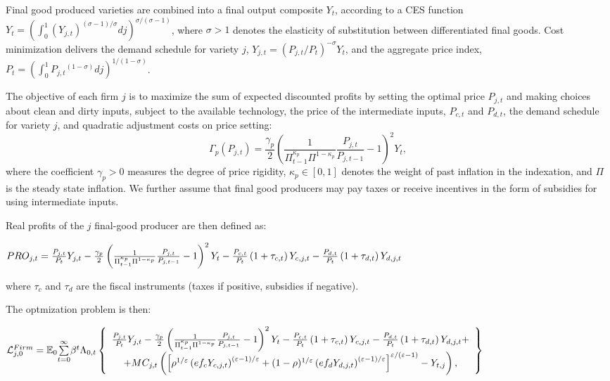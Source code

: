 \documentclass{article}
\begin{document}
Final good produced varieties are combined into a final output composite $%
Y_{t}$, according to a CES function $Y_{t}=\left( \int_{0}^{1}\left(
Y_{j,t}\right) ^{\left( \sigma -1\right) /\sigma }dj\right) ^{\sigma
/(\sigma -1)}$, where $\sigma >1$ denotes the elasticity of substitution
between differentiated final goods. Cost minimization delivers the demand
schedule for variety $j$, $Y_{j,t}=\left( P_{j,t}/P_{t}\right) ^{-\sigma
}Y_{t}$, and the aggregate price index, $P_{t}=\left(
\int_{0}^{1}P_{j,t}{}^{(1-\sigma )}dj\right) ^{1/(1-\sigma )}$.

The objective of each firm $j$ is to maximize the sum of expected discounted
profits by setting the optimal price $P_{j,t}$ and making choices about
clean and dirty inputs, subject to the available technology, the price of
the intermediate inputs, $P_{c,t}$ and $P_{d,t}$, the demand schedule for
variety $j$, and quadratic adjustment costs on price setting:%
\begin{equation}
\Gamma _{p}(P_{j,t})=\frac{\gamma _{p}}{2}\left( \frac{1}{\Pi _{t-1}^{\kappa
_{p}}\Pi ^{1-\kappa _{p}}}\frac{P_{j,t}}{P_{j,t-1}}-1\right) ^{2}Y_{t},
\label{price_adjust}
\end{equation}%
where the coefficient $\gamma _{p}>0$ measures the degree of price rigidity, 
$\kappa _{p}\in \left[ 0,1\right] $ denotes the weight of past inflation in
the indexation, and $\Pi $ is the steady state inflation. We further assume
that final good producers may pay taxes or receive incentives in the form of
subsidies for using intermediate inputs.

Real profits of the $j$ final-good producer are then defined as:

$PRO_{j,t}=\frac{P_{j,t}}{P_{t}}Y_{j,t}-\frac{\gamma _{p}}{2}\left( \frac{1}{%
\Pi _{t-1}^{\kappa _{p}}\Pi ^{1-\kappa _{p}}}\frac{P_{j,t}}{P_{j,t-1}}%
-1\right) ^{2}Y_{t}-\frac{P_{c,t}}{P_{t}}\left( 1+\tau _{c,t}\right)
Y_{c,j,t}-\frac{P_{d,t}}{P_{t}}\left( 1+\tau _{d,t}\right) Y_{d,j,t}$

where $\tau _{c}$ and $\tau _{d}$ are the fiscal instruments (taxes if
positive, subsidies if negative).

The optmization problem is then:

$\mathcal{L}_{j,0}^{Firm}=\mathbb{E}_{0}\underset{t=0}{\overset{\infty }{%
\sum }}\beta ^{t}\Lambda _{0,t}\left\{ 
\begin{array}{c}
\frac{P_{j,t}}{P_{t}}Y_{j,t}-\frac{\gamma _{p}}{2}\left( \frac{1}{\Pi
_{t-1}^{\kappa _{p}}\Pi ^{1-\kappa _{p}}}\frac{P_{j,t}}{P_{j,t-1}}-1\right)
^{2}Y_{t}-\frac{P_{c,t}}{P_{t}}\left( 1+\tau _{c,t}\right) Y_{c,j,t}-\frac{%
P_{d,t}}{P_{t}}\left( 1+\tau _{d,t}\right) Y_{d,j,t}+ \\ 
+MC_{j,t}\left( \left[ \rho ^{1/\varepsilon }\left( ef_{c}Y_{c,j,t}\right)
^{\left( \varepsilon -1\right) /\varepsilon }+(1-\rho )^{1/\varepsilon
}\left( ef_{d}Y_{d,j,t}\right) ^{\left( \varepsilon -1\right) /\varepsilon }%
\right] ^{\varepsilon /(\varepsilon -1)}-Y_{t,j}\right) ,%
\end{array}%
\right\} $
\end{document}
